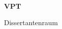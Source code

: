 \documentclass[a4paper]{article}
\begin{document}
\printGenericVSLHeader
\begin{center}
\begin{vsltext}{3cm}{4cm}

   \vspace{0.5cm} 

    \textbf{VPT} 

    \vspace{1.5cm}

    Dissertantenraum

\end{vsltext}

\end{center}
\end{document}

